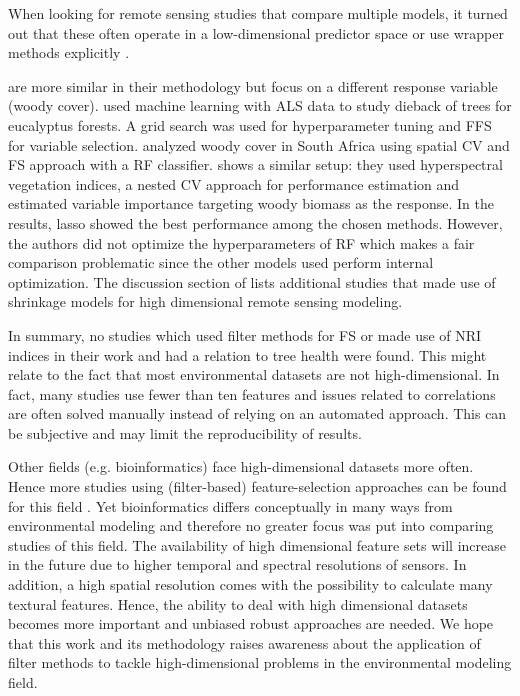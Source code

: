 \documentclass[final]{IEEEtran}
\begin{document}
When looking for remote sensing studies that compare multiple models, it turned out that these often operate in a low-dimensional predictor space \cite{xu2019} or use wrapper methods explicitly \cite{georganos2018}.

\cite{shendryk2016, ludwig2019} are more similar in their methodology but focus on a different response variable (woody cover).
\cite{shendryk2016} used machine learning with \ac{ALS} data to study dieback of trees for eucalyptus forests.
A grid search was used for hyperparameter tuning and \ac{FFS} for variable selection.
\cite{ludwig2019} analyzed woody cover in South Africa using spatial \ac{CV} and \ac{FS} approach \cite{meyer2018} with a RF classifier.
\cite{zandler2015} shows a similar setup: they used hyperspectral vegetation indices, a nested CV approach for performance estimation and estimated variable importance targeting woody biomass as the response.
In the results, lasso showed the best performance among the chosen methods.
However, the authors did not optimize the hyperparameters of RF which makes a fair comparison problematic since the other models used perform internal optimization.
The discussion section of \cite{zandler2015} lists additional studies that made use of shrinkage models for high dimensional remote sensing modeling.

In summary, no studies which used filter methods for \ac{FS} or made use of \ac{NRI} indices in their work and had a relation to tree health were found.
This might relate to the fact that most environmental datasets are not high-dimensional.
In fact, many studies use fewer than ten features and issues related to correlations are often solved manually instead of relying on an automated approach.
This can be subjective and may limit the reproducibility of results.

Other fields (e.g. bioinformatics) face high-dimensional datasets more often.
Hence more studies using (filter-based) feature-selection approaches can be found for this field \cite{guo2019, radovic2017}.
Yet bioinformatics differs conceptually in many ways from environmental modeling and therefore no greater focus was put into comparing studies of this field.
The availability of high dimensional feature sets will increase in the future due to higher temporal and spectral resolutions of sensors.
In addition, a high spatial resolution comes with the possibility to calculate many textural features.
Hence, the ability to deal with high dimensional datasets becomes more important and unbiased robust approaches are needed.
We hope that this work and its methodology raises awareness about the application of filter methods to tackle high-dimensional problems in the environmental modeling field.
\end{document}
